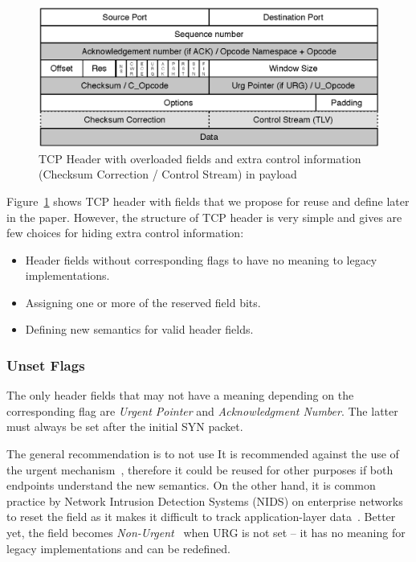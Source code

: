 \documentclass{sig-alternate-10pt}
\begin{document}
\begin{figure}[t!]
\centering
\small{
\includegraphics[width=\columnwidth]{figs/tcp-header}
\vspace{-3mm}
\caption{TCP Header with overloaded fields and extra control information (Checksum Correction / Control Stream) in payload}
\label{fig:header}
}
\vspace{-2mm}
\end{figure}

Figure~\ref{fig:header} shows TCP header with fields that we propose for reuse and define later in the paper. However, the structure of TCP header is very simple and gives are few choices for hiding extra control information:
\begin{itemize}
    \item Header fields without corresponding flags to have no meaning to legacy implementations.
    \item Assigning one or more of the reserved field bits.
    \item Defining new semantics for valid header fields.
\end{itemize}

\subsubsection*{Unset Flags}
\label{sec:unset}

The only header fields that may not have a meaning depending on the corresponding flag are \emph{Urgent Pointer} and \emph{Acknowledgment Number}. The latter must always be set after the initial SYN packet.

The general recommendation is to not use It is recommended against the use of the urgent mechanism~\cite{Gont:2011vi}, therefore it could be reused for other purposes if both endpoints understand the new semantics. On the other hand, it is common practice by Network Intrusion Detection Systems (NIDS) on enterprise networks to reset the field as it makes it difficult to track application-layer data~\cite{seolma}. Better yet, the field becomes \emph{Non-Urgent}~\cite{Kuhlewind:2014vd} when URG is not set -- it has no meaning for legacy implementations and can be redefined.
\end{document}
